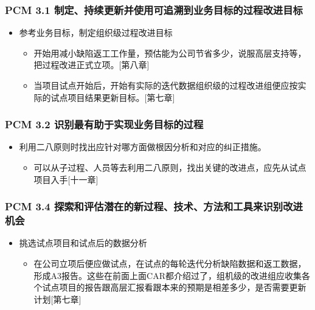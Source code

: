 \hypertarget{pcm-3.1-ux5236ux5b9aux6301ux7eedux66f4ux65b0ux5e76ux4f7fux7528ux53efux8ffdux6eafux5230ux4e1aux52a1ux76eeux6807ux7684ux8fc7ux7a0bux6539ux8fdbux76eeux6807}{%
\subsubsection{PCM 3.1
制定、持续更新并使用可追溯到业务目标的过程改进目标}\label{pcm-3.1-ux5236ux5b9aux6301ux7eedux66f4ux65b0ux5e76ux4f7fux7528ux53efux8ffdux6eafux5230ux4e1aux52a1ux76eeux6807ux7684ux8fc7ux7a0bux6539ux8fdbux76eeux6807}}

\begin{itemize}
\tightlist
\item
  参考业务目标，制定组织级过程改进目标

  \begin{itemize}
  \tightlist
  \item
    开始用减小缺陷返工工作量，预估能为公司节省多少，说服高层支持等，把过程改进正式立项。{[}第八章{]}
  \item
    当项目试点开始后，开始有实际的迭代数据组织级的过程改进组便应按实际的试点项目结果更新目标。{[}第七章{]}
  \end{itemize}
\end{itemize}

\hypertarget{pcm-3.2-ux8bc6ux522bux6700ux6709ux52a9ux4e8eux5b9eux73b0ux4e1aux52a1ux76eeux6807ux7684ux8fc7ux7a0b}{%
\subsubsection{PCM 3.2
识别最有助于实现业务目标的过程}\label{pcm-3.2-ux8bc6ux522bux6700ux6709ux52a9ux4e8eux5b9eux73b0ux4e1aux52a1ux76eeux6807ux7684ux8fc7ux7a0b}}

\begin{itemize}
\tightlist
\item
  利用二八原则时找出应针对哪方面做根因分析和对应的纠正措施。

  \begin{itemize}
  \tightlist
  \item
    可以从子过程、人员等去利用二八原则，找出关键的改进点，应先从试点项目入手{[}十一章{]}
  \end{itemize}
\end{itemize}

\hypertarget{pcm-3.4-ux63a2ux7d22ux548cux8bc4ux4f30ux6f5cux5728ux7684ux65b0ux8fc7ux7a0bux6280ux672fux65b9ux6cd5ux548cux5de5ux5177ux6765ux8bc6ux522bux6539ux8fdbux673aux4f1a}{%
\subsubsection{PCM 3.4
探索和评估潜在的新过程、技术、方法和工具来识别改进机会}\label{pcm-3.4-ux63a2ux7d22ux548cux8bc4ux4f30ux6f5cux5728ux7684ux65b0ux8fc7ux7a0bux6280ux672fux65b9ux6cd5ux548cux5de5ux5177ux6765ux8bc6ux522bux6539ux8fdbux673aux4f1a}}

\begin{itemize}
\tightlist
\item
  挑选试点项目和试点后的数据分析

  \begin{itemize}
  \tightlist
  \item
    在公司立项后便应做试点，在试点的每轮迭代分析缺陷数据和返工数据，形成A3报告。这些在前面上面CAR都介绍过了，组机级的改进组应收集各个试点项目的报告跟高层汇报看跟本来的预期是相差多少，是否需要更新计划{[}第七章{]}
  \end{itemize}
\end{itemize}



